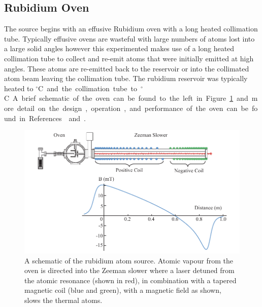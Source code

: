 \subsection{Rubidium Oven}
The source begins with an effusive Rubidium oven with a long heated collimation tube.
Typically effusive ovens are wasteful with large numbers of atoms lost into a large solid angles however this experimented makes use of a long heated collimation tube to collect and re-emit atoms that were initially emitted at high angles.
These atoms are re-emitted back to the reservoir or into the collimated atom beam leaving the collimation tube.
The rubidium reservoir was typically heated to \unit[80]{$^\circ$C} and the collimation tube to \unit[120]{$^\circ$C}.
A brief schematic of the oven can be found to the left in Figure~\ref{figure:zeemanoven} and more detail on the design, operation, and performance of the oven can be found in References~\cite{bell_slow_2010} and \cite{bell_cold_2011}.

\begin{figure}
    \center
    \includegraphics[width=145mm]{part2/Figs/ZeemanOven.pdf}
    \caption[A schematic of the rubidium atom source.]{A schematic of the rubidium atom source. Atomic vapour from the oven is directed into the Zeeman slower where a laser detuned from the atomic resonance (shown in red), in combination with a tapered magnetic coil (blue and green), with a magnetic field as shown, slows the thermal atoms.}
    \label{figure:zeemanoven}
\end{figure}

